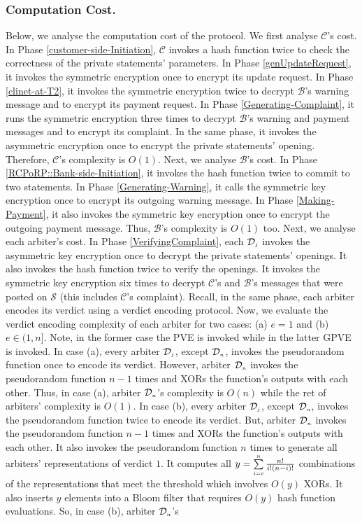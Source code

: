 \subsubsection{Computation Cost.} Below, we analyse the computation cost of the protocol. We first analyse $\mathcal{C}$'s cost. In Phase \ref{customer-side-Initiation}, $\mathcal{C}$ invokes a hash function twice to check the correctness of the private statements' parameters. In Phase \ref{genUpdateRequest}, it invokes the symmetric encryption once to encrypt its update request. In Phase \ref{clinet-at-T2}, it invokes  the symmetric encryption twice to decrypt $\mathcal{B}$'s warning message and to encrypt its payment request. In Phase \ref{Generating-Complaint}, it runs  the symmetric encryption three times to decrypt $\mathcal{B}$'s warning and payment messages and to encrypt its complaint. In the same phase, it invokes the asymmetric encryption once to encrypt the private statements' opening. Therefore, $\mathcal{C}$'s complexity   is  $O(1)$. Next, we analyse $\mathcal{B}$'s cost. In Phase \ref{RCPoRP::Bank-side-Initiation}, it invokes the hash function twice to commit  to  two statements. In Phase \ref{Generating-Warning}, it calls the symmetric key encryption once to encrypt its outgoing warning message. In Phase \ref{Making-Payment}, it also invokes  the symmetric key encryption once to encrypt the outgoing payment message. Thus, $\mathcal{B}$'s complexity   is  $O(1)$ too. Next, we analyse each arbiter's cost. In Phase \ref{VerifyingComplaint}, each $\mathcal{D}_{\scriptscriptstyle j}$ invokes the asymmetric key encryption once to decrypt the private statements' openings. It also invokes the hash function twice to verify the openings. It invokes the symmetric key encryption six times to decrypt $\mathcal{C}$'s and $\mathcal{B}$'s messages that were posted on $\mathcal{S}$ (this includes $\mathcal{C}$'s complaint). Recall, in the same phase, each arbiter encodes its verdict using a verdict encoding protocol. Now, we evaluate the verdict encoding complexity of each arbiter for two cases: (a)   $e=1$ and (b) $e\in(1, n]$. Note, in the former case the PVE is invoked while in the latter GPVE is invoked. In case (a), every arbiter $\mathcal{D}_{\scriptscriptstyle j}$, except $\mathcal{D}_{\scriptscriptstyle n}$, invokes the pseudorandom function once to encode its verdict. However,  arbiter $\mathcal{D}_{\scriptscriptstyle n}$ invokes the pseudorandom function $n-1$ times and XORs the function's outputs with each other. Thus, in  case (a), arbiter $\mathcal{D}_{\scriptscriptstyle n}$'s complexity is $O(n)$ while the ret of arbiters' complexity is $O(1)$.  In case (b), every arbiter $\mathcal{D}_{\scriptscriptstyle j}$, except $\mathcal{D}_{\scriptscriptstyle n}$, invokes the pseudorandom function twice to encode its verdict.  But,  arbiter $\mathcal{D}_{\scriptscriptstyle n}$ invokes the pseudorandom function $n-1$ times and XORs the function's outputs with each other. It also invokes  the pseudorandom function $n$ times to generate all arbiters' representations of verdict $1$. It computes all $y=\sum\limits_{\scriptscriptstyle i=e}^{\scriptscriptstyle n}\frac{n!}{i!(n- i)!}$ combinations of the representations that meet the threshold which involves $O(y)$ XORs. It also inserts $y$ elements into a Bloom filter that requires  $O(y)$ hash function evaluations. So, in case (b), arbiter $\mathcal{D}_{\scriptscriptstyle n}$'s 